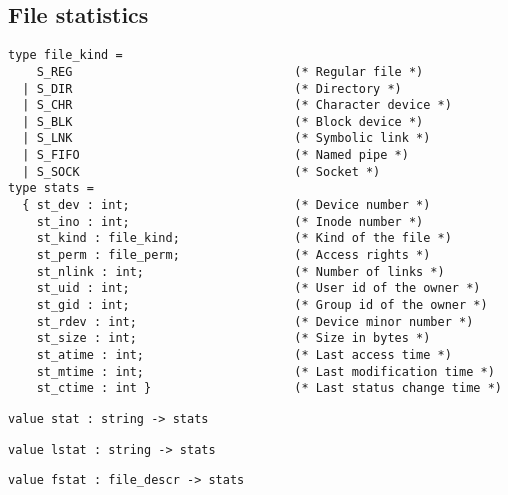 \subsection*{File statistics }\begin{verbatim}
type file_kind =
    S_REG                               (* Regular file *)
  | S_DIR                               (* Directory *)
  | S_CHR                               (* Character device *)
  | S_BLK                               (* Block device *)
  | S_LNK                               (* Symbolic link *)
  | S_FIFO                              (* Named pipe *)
  | S_SOCK                              (* Socket *)
type stats =
  { st_dev : int;                       (* Device number *)
    st_ino : int;                       (* Inode number *)
    st_kind : file_kind;                (* Kind of the file *)
    st_perm : file_perm;                (* Access rights *)
    st_nlink : int;                     (* Number of links *)
    st_uid : int;                       (* User id of the owner *)
    st_gid : int;                       (* Group id of the owner *)
    st_rdev : int;                      (* Device minor number *)
    st_size : int;                      (* Size in bytes *)
    st_atime : int;                     (* Last access time *)
    st_mtime : int;                     (* Last modification time *)
    st_ctime : int }                    (* Last status change time *)
\end{verbatim}
\begin{comment}
 The informations returned by the \verbstat calls. 
\end{comment}
\begin{verbatim}
value stat : string -> stats
\end{verbatim}
%
\begin{comment}
 Return the information for the named file. 
\end{comment}
\begin{verbatim}
value lstat : string -> stats
\end{verbatim}
%
\begin{comment}
 Same as \verbstat, but in case the file is a symbolic link,
           return the information for the link itself. 
\end{comment}
\begin{verbatim}
value fstat : file_descr -> stats
\end{verbatim}
%
\begin{comment}
 Return the information for the file associated with the given
           descriptor. 
\end{comment}
